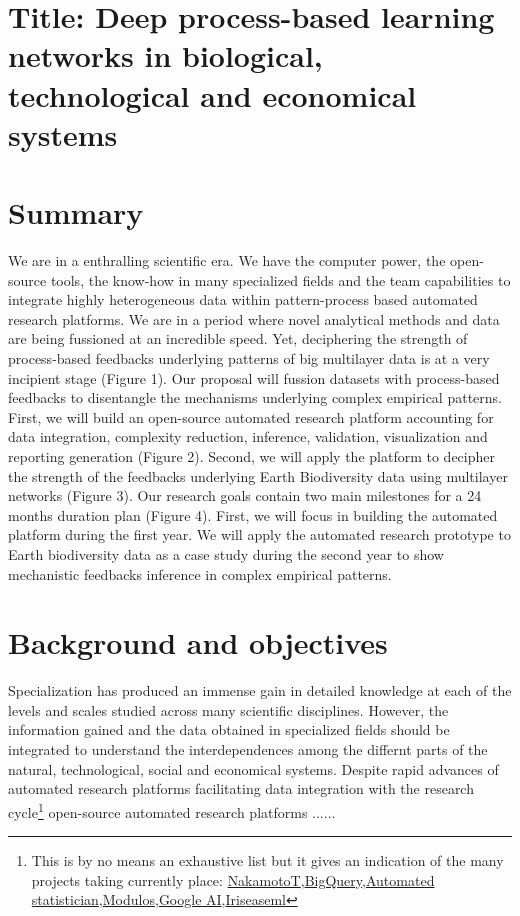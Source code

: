 \documentclass[authoryear,1p,12pt]{elsarticle}
\begin{document}
\section{{\bf Title: Deep process-based learning networks in biological, technological and economical systems}}

\section{{\bf Summary}}
We are in a enthralling scientific era. We have the computer power,
the open-source tools, the know-how in many specialized fields and the
team capabilities to integrate highly heterogeneous data within
pattern-process based automated research platforms. We are in a period
where novel analytical methods and data are being fussioned at an
incredible speed. Yet, deciphering the strength of process-based
feedbacks underlying patterns of big multilayer data is at a very
incipient stage (Figure 1). Our proposal will fussion datasets with
process-based feedbacks to disentangle the mechanisms underlying
complex empirical patterns. First, we will build an open-source
automated research platform accounting for data integration,
complexity reduction, inference, validation, visualization and
reporting generation (Figure 2). Second, we will apply the platform to
decipher the strength of the feedbacks underlying Earth Biodiversity
data using multilayer networks (Figure 3). Our research goals contain
two main milestones for a 24 months duration plan (Figure 4). First,
we will focus in building the automated platform during the first
year. We will apply the automated research prototype to Earth
biodiversity data as a case study during the second year to show
mechanistic feedbacks inference in complex empirical patterns.

\newpage

\section{Background and objectives}

\noindent Specialization has produced an immense gain in detailed
knowledge at each of the levels and scales studied across many
scientific disciplines. However, the information gained and the data
obtained in specialized fields should be integrated to understand the
interdependences among the differnt parts of the natural,
technological, social and economical systems. Despite rapid advances
of automated research platforms facilitating data integration with the
research cycle\footnote{This is by no means an exhaustive list but it
  gives an indication of the many projects taking currently place:
  \href{https://www.nterminal.com}{NakamotoT},\href{https://cloud.google.com/bigquery/}{BigQuery},\href{https://www.automaticstatistician.com/index/}{Automated
    statistician},\href{http://www.modulos.ai/}{Modulos},\href{https://ai.google/}{Google
    AI},\href{https://iris.ai}{Iris}\href{https://github.com/DS3Lab/easeml}{easeml}}
open-source automated research platforms ......
\end{document}
